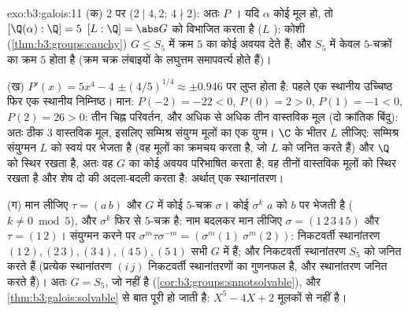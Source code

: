\begin{solution}{exo:b3:galois:11}
(क) $2$ पर  ($2 \mid 4, 2$; $4 \nmid 2$): अतः $P$ । यदि
$\alpha$ कोई मूल हो, तो $[\Q(\alpha):\Q] = 5$ $[L:\Q] = \abs G$ को विभाजित करता है ($L$ ): कोशी (\cref{thm:b3:groups:cauchy}) $G \leq S_5$ में क्रम $5$ का कोई अवयव देते हैं;
और $S_5$ में केवल $5$-चक्रों का क्रम $5$ होता है (क्रम चक्र
लंबाइयों के लघुत्तम समापवर्त्य होते हैं)।

(ख) $P'(x) = 5x^4 - 4$ $\pm(4/5)^{1/4} \approx \pm
0.946$ पर लुप्त होता है: पहले एक स्थानीय उच्चिष्ठ फिर एक
स्थानीय निम्निष्ठ। मान: $P(-2)
= -22 < 0$, $P(0) = 2 > 0$, $P(1) = -1 < 0$, $P(2) = 26 > 0$: तीन चिह्न
परिवर्तन, और अधिक से अधिक तीन वास्तविक मूल (दो क्रांतिक बिंदु): अतः
ठीक $3$ वास्तविक मूल, इसलिए सम्मिश्र संयुग्म मूलों का एक युग्म।
$\C$ के भीतर  $L$ लीजिए: सम्मिश्र संयुग्मन $L$
को स्वयं पर भेजता है (वह मूलों का क्रमचय करता है, जो $L$ को जनित
करते हैं) और $\Q$ को स्थिर रखता है, अतः वह $G$ का कोई अवयव
परिभाषित करता है; वह तीनों वास्तविक मूलों को स्थिर रखता है और शेष
दो की अदला-बदली करता है: अर्थात् एक स्थानांतरण।

(ग) मान लीजिए $\tau = (a\,b)$ और $G$ में कोई $5$-चक्र $\sigma$। कोई 
$\sigma^k$ $a$ को $b$ पर भेजती है ($k \ne 0 \bmod 5$), और $\sigma^k$ फिर से $5$-चक्र
है: नाम बदलकर मान लीजिए $\sigma =
(1\,2\,3\,4\,5)$ और $\tau = (1\,2)$। संयुग्मन करने पर $\sigma^m\tau\sigma^{-m} = (\sigma^m(1)\ \sigma^m(2))$:
निकटवर्ती स्थानांतरण $(1\,2), (2\,3), (3\,4), (4\,5),
(5\,1)$ सभी $G$ में हैं; और निकटवर्ती स्थानांतरण
$S_5$ को जनित करते हैं (प्रत्येक स्थानांतरण $(i\,j)$ निकटवर्ती
स्थानांतरणों का गुणनफल है, और स्थानांतरण जनित करते हैं)। अतः $G = S_5$,
जो  नहीं है (\cref{cor:b3:groups:snnotsolvable}), और \cref{thm:b3:galois:solvable} से बात पूरी हो जाती है: $X^5 - 4X + 2$
मूलकों से  नहीं है।
\end{solution}

